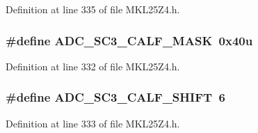 Definition at line 335 of file M\+K\+L25\+Z4.\+h.

\subsubsection[{\texorpdfstring{A\+D\+C\+\_\+\+S\+C3\+\_\+\+C\+A\+L\+F\+\_\+\+M\+A\+SK}{ADC_SC3_CALF_MASK}}]{\setlength{\rightskip}{0pt plus 5cm}\#define A\+D\+C\+\_\+\+S\+C3\+\_\+\+C\+A\+L\+F\+\_\+\+M\+A\+SK~0x40u}\hypertarget{group___a_d_c___register___masks_ga3a706436447b6113727826e303c3fbe6}{}\label{group___a_d_c___register___masks_ga3a706436447b6113727826e303c3fbe6}


Definition at line 332 of file M\+K\+L25\+Z4.\+h.

\subsubsection[{\texorpdfstring{A\+D\+C\+\_\+\+S\+C3\+\_\+\+C\+A\+L\+F\+\_\+\+S\+H\+I\+FT}{ADC_SC3_CALF_SHIFT}}]{\setlength{\rightskip}{0pt plus 5cm}\#define A\+D\+C\+\_\+\+S\+C3\+\_\+\+C\+A\+L\+F\+\_\+\+S\+H\+I\+FT~6}\hypertarget{group___a_d_c___register___masks_ga9fd60a35fc4c15b563078ecbd3eaa449}{}\label{group___a_d_c___register___masks_ga9fd60a35fc4c15b563078ecbd3eaa449}


Definition at line 333 of file M\+K\+L25\+Z4.\+h.

